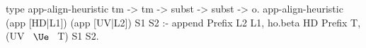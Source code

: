   type app-align-heuristic tm -> tm -> subst -> subst -> o.
  app-align-heuristic (app [HD|L1]) (app [UV|L2]) S1 S2 :-
    append Prefix L2 L1,
    ho.beta HD Prefix T,
    (UV ~$\Ue$~ T) S1 S2.
